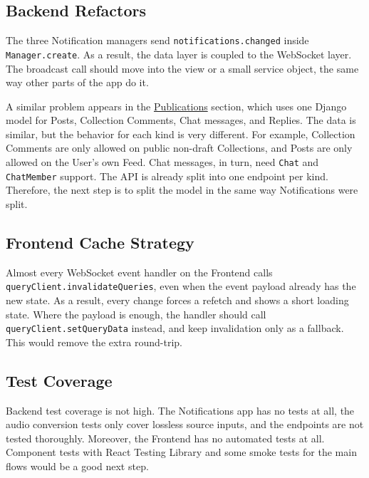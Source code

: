 \subsection{Backend Refactors}\label{subsec:imp_be_refactors}
The three Notification managers send
\texttt{notifications.changed} inside
\texttt{Manager.create}. As a result, the data layer is coupled
to the WebSocket layer. The broadcast call should move into the
view or a small service object, the same way other parts of the
app do it.

A similar problem appears in the
\hyperref[sec:publications]{Publications} section, which uses
one Django model for Posts, Collection Comments, Chat messages,
and Replies. The data is similar, but the behavior for each
kind is very different. For example, Collection Comments are
only allowed on public non-draft Collections, and Posts are only
allowed on the User's own Feed. Chat messages, in turn, need
\texttt{Chat} and \texttt{ChatMember} support. The API is
already split into one endpoint per kind. Therefore, the next
step is to split the model in the same way Notifications were
split.

\subsection{Frontend Cache Strategy}\label{subsec:imp_cache}
Almost every WebSocket event handler on the Frontend calls\\
\texttt{queryClient.invalidateQueries}, even when the event
payload already has the new state. As a result, every change
forces a refetch and shows a short loading state. Where the
payload is enough, the handler should call
\texttt{queryClient.setQueryData} instead, and keep invalidation
only as a fallback. This would remove the extra round-trip.

\subsection{Test Coverage}\label{subsec:imp_tests}
Backend test coverage is not high. The Notifications app has no
tests at all, the audio conversion tests only cover lossless
source inputs, and the endpoints are not tested thoroughly.
Moreover, the Frontend has no automated tests at all. Component
tests with React Testing Library and some smoke tests for the
main flows would be a good next step.

